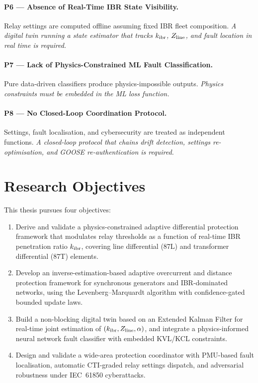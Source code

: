 \paragraph{P6 --- Absence of Real-Time IBR State Visibility.}
Relay settings are computed offline assuming fixed IBR fleet composition.
\emph{A digital twin running a state estimator that tracks $k_\mathrm{ibr}$,
$Z_\mathrm{line}$, and fault location in real time is required.}

\paragraph{P7 --- Lack of Physics-Constrained ML Fault Classification.}
Pure data-driven classifiers produce physics-impossible outputs. \emph{Physics
constraints must be embedded in the ML loss function.}

\paragraph{P8 --- No Closed-Loop Coordination Protocol.}
Settings, fault localisation, and cybersecurity are treated as independent
functions. \emph{A closed-loop protocol that chains drift detection, settings
re-optimisation, and GOOSE re-authentication is required.}

\section{Research Objectives}
\label{sec:ch1_objectives}

This thesis pursues four objectives:

\begin{enumerate}[label=\textbf{O\arabic*}]
\item \label{O1} Derive and validate a physics-constrained adaptive
      differential protection framework that modulates relay thresholds
      as a function of real-time IBR penetration ratio $k_\mathrm{ibr}$, covering
      line differential (87L) and transformer differential (87T) elements.

\item \label{O2} Develop an inverse-estimation-based adaptive overcurrent
      and distance protection framework for synchronous generators and
      IBR-dominated networks, using the Levenberg--Marquardt algorithm
      with confidence-gated bounded update laws.

\item \label{O3} Build a non-blocking digital twin based on an Extended
      Kalman Filter for real-time joint estimation of $(k_\mathrm{ibr}, Z_\mathrm{line},
      \alpha)$, and integrate a physics-informed neural network fault
      classifier with embedded KVL/KCL constraints.

\item \label{O4} Design and validate a wide-area protection coordinator
      with PMU-based fault localisation, automatic CTI-graded relay
      settings dispatch, and adversarial robustness under IEC~61850
      cyberattacks.
\end{enumerate}

